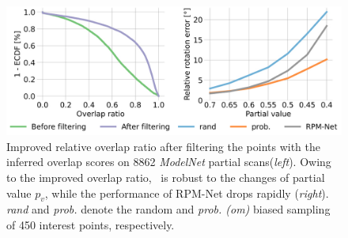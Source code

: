\begin{figure}[t]
    \centering
    \includegraphics[width=\columnwidth]{figures/images/modelnet.jpg}

    \caption{Improved relative overlap ratio after filtering the points with the inferred overlap scores on 8862 \textit{ModelNet} partial scans(\textit{left}). Owing to the improved overlap ratio, \acro\ is robust to the changes of partial value $p_v$, while the performance of RPM-Net drops rapidly (\textit{right}).  \textit{rand} and \textit{prob.} denote the random and \emph{prob. (om)} biased sampling of 450 interest points, respectively.}%
    \label{fig:modelnet}
    
\end{figure}